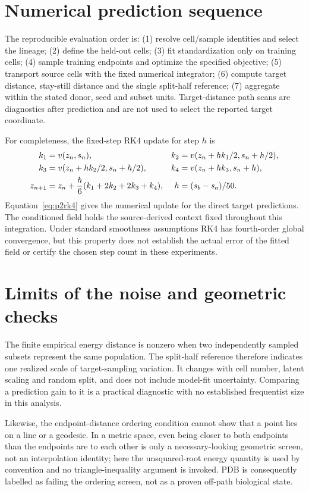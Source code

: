 \section{Numerical prediction sequence}
The reproducible evaluation order is: (1) resolve cell/sample identities and select the lineage; (2) define the held-out cells; (3) fit standardization only on training cells; (4) sample training endpoints and optimize the specified objective; (5) transport source cells with the fixed numerical integrator; (6) compute target distance, stay-still distance and the single split-half reference; (7) aggregate within the stated donor, seed and subset units. Target-distance path scans are diagnostics after prediction and are not used to select the reported target coordinate.

For completeness, the fixed-step RK4 update for step $h$ is
\begin{align}
k_1&=v(z_n,s_n),& k_2&=v(z_n+hk_1/2,s_n+h/2),\notag\\
k_3&=v(z_n+hk_2/2,s_n+h/2),& k_4&=v(z_n+hk_3,s_n+h),\notag\\
z_{n+1}&=z_n+\frac h6(k_1+2k_2+2k_3+k_4),&h&=(s_b-s_a)/50.\label{eq:p2rk4}
\end{align}
Equation~\eqref{eq:p2rk4} gives the numerical update for the direct target predictions. The conditioned field holds the source-derived context fixed throughout this integration. Under standard smoothness assumptions RK4 has fourth-order global convergence, but this property does not establish the actual error of the fitted field or certify the chosen step count in these experiments.

\section{Limits of the noise and geometric checks}
The finite empirical energy distance is nonzero when two independently sampled subsets represent the same population. The split-half reference therefore indicates one realized scale of target-sampling variation. It changes with cell number, latent scaling and random split, and does not include model-fit uncertainty. Comparing a prediction gain to it is a practical diagnostic with no established frequentist size in this analysis.

Likewise, the endpoint-distance ordering condition cannot show that a point lies on a line or a geodesic. In a metric space, even being closer to both endpoints than the endpoints are to each other is only a necessary-looking geometric screen, not an interpolation identity; here the unsquared-root energy quantity is used by convention and no triangle-inequality argument is invoked. PDB is consequently labelled as failing the ordering screen, not as a proven off-path biological state.

